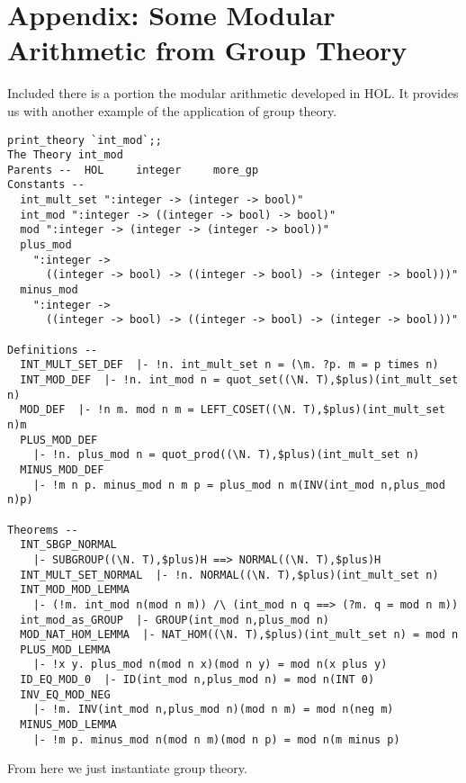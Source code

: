 \newpage
\section{Appendix: Some Modular Arithmetic from Group Theory}

Included there is a portion the modular arithmetic developed in HOL.  It
provides us with another example of the application of group theory. 

\begin{verbatim}
print_theory `int_mod`;;
The Theory int_mod
Parents --  HOL     integer     more_gp     
Constants --
  int_mult_set ":integer -> (integer -> bool)"
  int_mod ":integer -> ((integer -> bool) -> bool)"
  mod ":integer -> (integer -> (integer -> bool))"
  plus_mod
    ":integer ->
      ((integer -> bool) -> ((integer -> bool) -> (integer -> bool)))"
  minus_mod
    ":integer ->
      ((integer -> bool) -> ((integer -> bool) -> (integer -> bool)))"
  
Definitions --
  INT_MULT_SET_DEF  |- !n. int_mult_set n = (\m. ?p. m = p times n)
  INT_MOD_DEF  |- !n. int_mod n = quot_set((\N. T),$plus)(int_mult_set n)
  MOD_DEF  |- !n m. mod n m = LEFT_COSET((\N. T),$plus)(int_mult_set n)m
  PLUS_MOD_DEF 
    |- !n. plus_mod n = quot_prod((\N. T),$plus)(int_mult_set n)
  MINUS_MOD_DEF
    |- !m n p. minus_mod n m p = plus_mod n m(INV(int_mod n,plus_mod n)p)
  
Theorems --
  INT_SBGP_NORMAL
    |- SUBGROUP((\N. T),$plus)H ==> NORMAL((\N. T),$plus)H
  INT_MULT_SET_NORMAL  |- !n. NORMAL((\N. T),$plus)(int_mult_set n)
  INT_MOD_MOD_LEMMA
    |- (!m. int_mod n(mod n m)) /\ (int_mod n q ==> (?m. q = mod n m))
  int_mod_as_GROUP  |- GROUP(int_mod n,plus_mod n)
  MOD_NAT_HOM_LEMMA  |- NAT_HOM((\N. T),$plus)(int_mult_set n) = mod n
  PLUS_MOD_LEMMA
    |- !x y. plus_mod n(mod n x)(mod n y) = mod n(x plus y)
  ID_EQ_MOD_0  |- ID(int_mod n,plus_mod n) = mod n(INT 0)
  INV_EQ_MOD_NEG
    |- !m. INV(int_mod n,plus_mod n)(mod n m) = mod n(neg m)
  MINUS_MOD_LEMMA
    |- !m p. minus_mod n(mod n m)(mod n p) = mod n(m minus p)
\end{verbatim}
\newpage
From here we just instantiate group theory.
